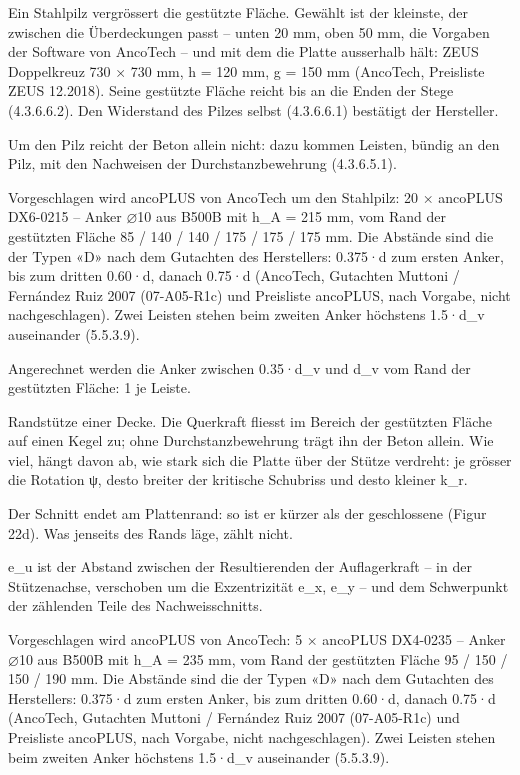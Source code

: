 \documentclass[11pt,a4paper]{article}
\begin{document}
Ein Stahlpilz vergrössert die gestützte Fläche. Gewählt ist der kleinste, der zwischen die Überdeckungen passt -- unten 20 mm, oben 50 mm, die Vorgaben der Software von AncoTech -- und mit dem die Platte ausserhalb hält: ZEUS Doppelkreuz 730 × 730 mm, h = 120 mm, g = 150 mm (AncoTech, Preisliste ZEUS 12.2018). Seine gestützte Fläche reicht bis an die Enden der Stege (4.3.6.6.2). Den Widerstand des Pilzes selbst (4.3.6.6.1) bestätigt der Hersteller.

Um den Pilz reicht der Beton allein nicht: dazu kommen Leisten, bündig an den Pilz, mit den Nachweisen der Durchstanzbewehrung (4.3.6.5.1).

Vorgeschlagen wird ancoPLUS von AncoTech um den Stahlpilz: 20 × ancoPLUS DX6-0215 -- Anker ⌀10 aus B500B mit h\_A = 215 mm, vom Rand der gestützten Fläche 85 / 140 / 140 / 175 / 175 / 175 mm. Die Abstände sind die der Typen «D» nach dem Gutachten des Herstellers: 0.375·d zum ersten Anker, bis zum dritten 0.60·d, danach 0.75·d (AncoTech, Gutachten Muttoni / Fernández Ruiz 2007 (07-A05-R1c) und Preisliste ancoPLUS, nach Vorgabe, nicht nachgeschlagen). Zwei Leisten stehen beim zweiten Anker höchstens 1.5·d\_v auseinander (5.5.3.9).

Angerechnet werden die Anker zwischen 0.35·d\_v und d\_v vom Rand der gestützten Fläche: 1 je Leiste.

Randstütze einer Decke. Die Querkraft fliesst im Bereich der gestützten Fläche auf einen Kegel zu; ohne Durchstanzbewehrung trägt ihn der Beton allein. Wie viel, hängt davon ab, wie stark sich die Platte über der Stütze verdreht: je grösser die Rotation ψ, desto breiter der kritische Schubriss und desto kleiner k\_r.

Der Schnitt endet am Plattenrand: so ist er kürzer als der geschlossene (Figur 22d). Was jenseits des Rands läge, zählt nicht.

e\_u ist der Abstand zwischen der Resultierenden der Auflagerkraft -- in der Stützenachse, verschoben um die Exzentrizität e\_x, e\_y -- und dem Schwerpunkt der zählenden Teile des Nachweisschnitts.

Vorgeschlagen wird ancoPLUS von AncoTech: 5 × ancoPLUS DX4-0235 -- Anker ⌀10 aus B500B mit h\_A = 235 mm, vom Rand der gestützten Fläche 95 / 150 / 150 / 190 mm. Die Abstände sind die der Typen «D» nach dem Gutachten des Herstellers: 0.375·d zum ersten Anker, bis zum dritten 0.60·d, danach 0.75·d (AncoTech, Gutachten Muttoni / Fernández Ruiz 2007 (07-A05-R1c) und Preisliste ancoPLUS, nach Vorgabe, nicht nachgeschlagen). Zwei Leisten stehen beim zweiten Anker höchstens 1.5·d\_v auseinander (5.5.3.9).
\end{document}
